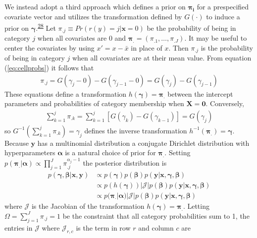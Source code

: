 \documentclass[
]{article}
\begin{document}
We instead adopt a third approach which defines a prior on \(\boldsymbol{\pi_i}\) for a prespecified covariate vector and utilizes the transformation defined by \(G(\cdot)\) to induce a prior on \(\boldsymbol{\gamma}\).\textsuperscript{\protect\hyperlink{ref-betancourt_ordinal_2019}{28}}
Let \(\pi_{.j} \equiv Pr(r(y)=j|\boldsymbol{x}=0)\) be the probability of being in category \(j\) when all covariates are 0 and \(\boldsymbol{\pi_{.}}=(\pi_{.1},\ldots,\pi_{.J})\).
It may be useful to center the covariates by using \(x'=x-\bar{x}\) in place of \(x\). Then \(\pi_{.j}\) is the probability of being in category \(j\) when all covariates are at their mean value. From equation (\ref{eq:cellprobs}) it follows that
\begin{gather}
\pi_{.j}=G(\gamma_j-0)-G(\gamma_{j-1}-0)=G(\gamma_j)-G(\gamma_{j-1})
\end{gather}
These equations define a transformation \(h(\boldsymbol{\gamma})=\boldsymbol{\pi_{.}}\) between the intercept parameters and probabilities of category membership when \(\boldsymbol{X}=\boldsymbol{0}\). Conversely,
\begin{gather}
\label{eq:invtrans}
\sum_{k=1}^{j}\pi_{.k}=\sum_{k=1}^{j}\left[G(\gamma_k)-G(\gamma_{k-1})\right]=G(\gamma_j)
\end{gather}
so \(G^{-1}\left(\sum_{k=1}^{j}\pi_{.k}\right)=\gamma_j\) defines the inverse transformation \(h^{-1}(\boldsymbol{\pi_{.}})=\boldsymbol{\gamma}\). Because \(\boldsymbol{y}\) has a multinomial distribution a conjugate Dirichlet distribution with hyperparameters \(\boldsymbol{\alpha}\) is a natural choice of prior for \(\boldsymbol{\pi_{.}}\). Setting \(p(\boldsymbol{\pi_{.}}|\boldsymbol{\alpha}) \propto \prod_{j=1}^{J}\pi_{.j}^{\alpha_j-1}\) the posterior distribution is
\begin{align}
p(\boldsymbol{\gamma},\boldsymbol{\beta}|\boldsymbol{x},\boldsymbol{y}) & \propto p(\boldsymbol{\gamma})p(\boldsymbol{\beta}) p(\boldsymbol{y}|\boldsymbol{x},\boldsymbol{\gamma},\boldsymbol{\beta})\\
&\propto p(h(\boldsymbol{\gamma}))|\mathcal{J}|p(\boldsymbol{\beta}) p(\boldsymbol{y}|\boldsymbol{x},\boldsymbol{\gamma},\boldsymbol{\beta})\\
\label{eq:post}
&\propto p(\boldsymbol{\pi_{\cdot}}|\boldsymbol{\alpha})|\mathcal{J}|p(\boldsymbol{\beta}) p(\boldsymbol{y}|\boldsymbol{x},\boldsymbol{\gamma},\boldsymbol{\beta})
\end{align}
where \(\mathcal{J}\) is the Jacobian of the transformation \(h(\boldsymbol{\gamma})=\boldsymbol{\pi_{.}}\). Letting \(\Omega=\sum_{j=1}^J\pi_{.j}=1\) be the constraint that all category probabilities sum to 1, the entries in \(\mathcal{J}\) where \(\mathcal{J}_{r,c}\) is the term in row \(r\) and column \(c\) are
\end{document}
